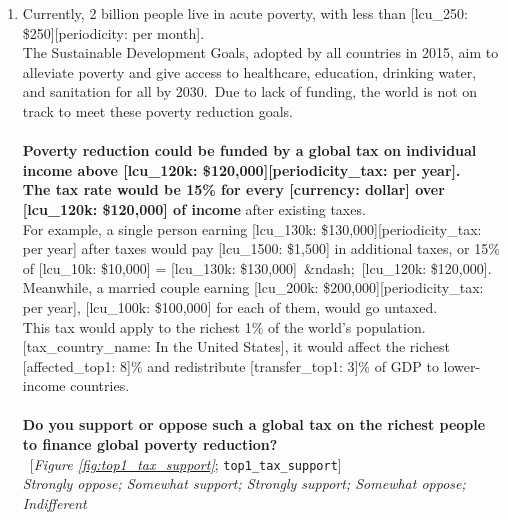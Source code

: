 \begin{enumerate}[resume]
\item  \label{q:top1_tax_support} Currently, 2 billion people live in acute poverty, with less than [lcu\_250: \$250][periodicity: per month].\\The Sustainable Development Goals, adopted by all countries in 2015, aim to alleviate poverty and give access to healthcare, education, drinking water, and sanitation for all by 2030.~Due to lack of funding, the world is not on track to meet these poverty reduction goals.\\\\\textbf{Poverty reduction could be funded by a global tax on individual income above [lcu\_120k: \$120,000][periodicity\_tax: per year].~\\The tax rate would be 15\% for every [currency: dollar] over [lcu\_120k: \$120,000] of income} after existing taxes.~\\For example, a single person earning [lcu\_130k: \$130,000][periodicity\_tax: per year] after taxes would pay [lcu\_1500: \$1,500] in additional taxes, or 15\% of [lcu\_10k: \$10,000] = [lcu\_130k: \$130,000]~\&ndash;~[lcu\_120k: \$120,000]. Meanwhile, a married couple earning [lcu\_200k: \$200,000][periodicity\_tax: per year], [lcu\_100k: \$100,000] for each of them, would go untaxed.\\This tax would apply to the richest 1\% of the world's population. [tax\_country\_name: In the United States], it would affect the richest [affected\_top1: 8]\% and redistribute [transfer\_top1: 3]\% of GDP to lower-income countries.\\\\\textbf{Do you support or oppose such a global tax on the richest people to finance global poverty reduction?}\\ 
~[\textit{Figure \ref{fig:top1_tax_support}}; 
\verb|top1_tax_support|]
  \\ \textit{Strongly oppose; Somewhat support; Strongly support; Somewhat oppose; Indifferent}


\end{enumerate}

